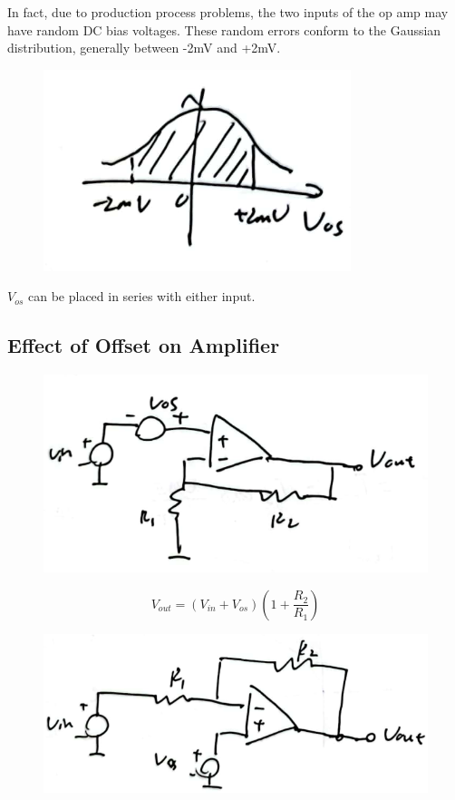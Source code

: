 \documentclass[fontset=windows]{article}
\begin{document}
In fact, due to production process problems, the two inputs of the op amp may have random DC bias voltages. These random errors conform to the Gaussian distribution, generally between -2mV and +2mV. 

\begin{figure}[htbp]
    \centering
    \includegraphics[scale=0.8]{7.jpg}
    \captionsetup{labelformat=empty}
    \caption{}
    \label{7}
\end{figure}

$V_{os}$ can be placed in series with either input. 

\subsection*{Effect of Offset on Amplifier}

\begin{figure}[htbp]
    \centering
    \includegraphics[scale=0.8]{8.jpg}
    \captionsetup{labelformat=empty}
    \caption{}
    \label{8}
\end{figure}

$$V_{out}=(V_{in}+V_{os})(1+\frac{R_2}{R_1})$$

\begin{figure}[htbp]
    \centering
    \includegraphics[scale=0.8]{9.jpg}
    \captionsetup{labelformat=empty}
    \caption{}
    \label{9}
\end{figure}
\end{document}
